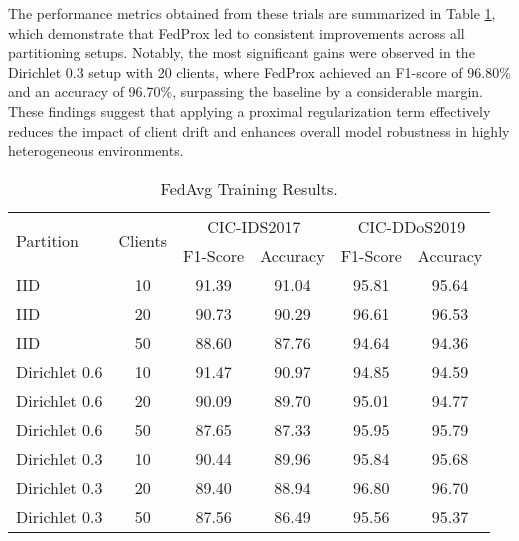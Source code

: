 The performance metrics obtained from these trials are summarized in Table \ref{tbl:fedprox_results}, which demonstrate that FedProx led to consistent improvements across all partitioning setups. Notably, the most significant gains were observed in the Dirichlet 0.3 setup with 20 clients, where FedProx achieved an F1-score of 96.80\% and an accuracy of 96.70\%, surpassing the baseline by a considerable margin. These findings suggest that applying a proximal regularization term effectively reduces the impact of client drift and enhances overall model robustness in highly heterogeneous environments.


\begin{table}[h]
    \caption{FedAvg Training Results.}
    \centering
    \begin{tabular}{l|c|c|c|c|c}
        \multirow{2}{*}{Partition} & \multirow{2}{*}{Clients} & \multicolumn{2}{|c|}{CIC-IDS2017} & \multicolumn{2}{|c}{CIC-DDoS2019} \\
        \cline{3-6} & & F1-Score & Accuracy & F1-Score & Accuracy \\
        \hline\hline
        IID & 10 & 91.39 & 91.04 & 95.81 & 95.64 \\
        IID & 20 & 90.73 & 90.29 & 96.61 & 96.53 \\
        IID & 50 & 88.60 & 87.76 & 94.64 & 94.36 \\
        Dirichlet 0.6 & 10 & 91.47 & 90.97 & 94.85 & 94.59 \\
        Dirichlet 0.6 & 20 & 90.09 & 89.70 & 95.01 & 94.77 \\
        Dirichlet 0.6 & 50 & 87.65 & 87.33 & 95.95 & 95.79 \\
        Dirichlet 0.3 & 10 & 90.44 & 89.96 & 95.84 & 95.68 \\
        Dirichlet 0.3 & 20 & 89.40 & 88.94 & 96.80 & 96.70 \\
        Dirichlet 0.3 & 50 & 87.56 & 86.49 & 95.56 & 95.37 \\
    \end{tabular}
    \label{tbl:fedprox_results}
\end{table}


